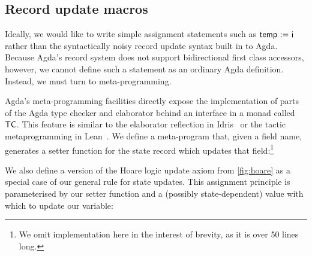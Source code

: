\documentclass[sigplan,review]{acmart}\settopmatter{printfolios=true,printccs=false,printacmref=false}
\begin{document}
\subsection{Record update macros}

Ideally, we would like to write simple assignment statements 
such as $\AgdaField{temp}\ \AgdaMacro{\ensuremath{:=}}\ \AgdaField{i}$ rather than 
the syntactically noisy record update syntax built in to Agda. Because Agda's 
record system does not support bidirectional first class accessors, however, 
we cannot define such a statement as an ordinary Agda definition. Instead, 
we must turn to meta-programming.

Agda's meta-programming facilities directly expose the implementation of
parts of the Agda type checker and elaborator behind an interface in a 
monad called $\AgdaDatatype{TC}$. This feature is similar to the 
elaborator reflection in Idris~\citep{elab1} or the tactic metaprogramming in Lean~\citep{leantac}.
We define a meta-program that, given a field name, generates a setter function 
for the state record which updates that field:\footnote{We omit implementation here 
in the interest of brevity, as it is over 50 lines long.}
\begin{code}
  \>[3]\AgdaSpace{}%
  \AgdaSymbol{:}\AgdaSpace{}%
  \AgdaSymbol{\{}\AgdaSpace{}%
  \AgdaSymbol{:}\AgdaSpace{}%
  \AgdaSymbol{\}}\AgdaSpace{}%
  \AgdaSpace{}%
  \AgdaSpace{}%
  \AgdaSpace{}%
  \AgdaSpace{}%
  \AgdaSymbol{(}\AgdaSpace{}%
  \AgdaSpace{}%
  \AgdaSpace{}%
  \AgdaSpace{}%
  \AgdaSymbol{)}\<%
\end{code}
We also define a version of the Hoare logic update
axiom from \autoref{fig:hoare} as a special case of our 
general rule for state updates. This assignment principle is 
parameterised by our setter function and a (possibly state-dependent)
value with which to update our variable:
\end{document}
